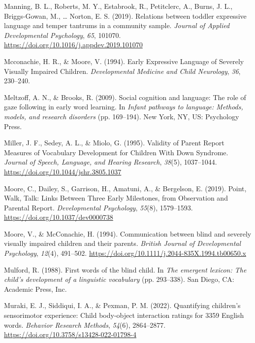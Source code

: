 \documentclass[
  man,floatsintext]{apa6}
\newlength{\cslhangindent}
\newlength{\cslentryspacingunit} %
\newenvironment{CSLReferences}[2] %
 {%
  \setlength{\parindent}{0pt}
  \ifodd #1
  \let\oldpar\par
  \def\par{\hangindent=\cslhangindent\oldpar}
  \fi
  \setlength{\parskip}{#2\cslentryspacingunit}
 }%
 {}
\begin{document}
\begin{CSLReferences}{1}{0}
\leavevmode{}%
Manning, B. L., Roberts, M. Y., Estabrook, R., Petitclerc, A., Burns, J. L., Briggs-Gowan, M., \ldots{} Norton, E. S. (2019). Relations between toddler expressive language and temper tantrums in a community sample. \emph{Journal of Applied Developmental Psychology}, \emph{65}, 101070. \url{https://doi.org/10.1016/j.appdev.2019.101070}

\leavevmode{}%
Mcconachie, H. R., \& Moore, V. (1994). Early {Expressive Language} of {Severely Visually Impaired Children}. \emph{Developmental Medicine and Child Neurology}, \emph{36}, 230--240.

\leavevmode{}%
Meltzoff, A. N., \& Brooks, R. (2009). Social cognition and language: {The} role of gaze following in early word learning. In \emph{Infant pathways to language: {Methods}, models, and research disorders} (pp. 169--194). {New York, NY, US}: {Psychology Press}.

\leavevmode{}%
Miller, J. F., Sedey, A. L., \& Miolo, G. (1995). Validity of {Parent Report Measures} of {Vocabulary Development} for {Children With Down Syndrome}. \emph{Journal of Speech, Language, and Hearing Research}, \emph{38}(5), 1037--1044. \url{https://doi.org/10.1044/jshr.3805.1037}

\leavevmode{}%
Moore, C., Dailey, S., Garrison, H., Amatuni, A., \& Bergelson, E. (2019). Point, {Walk}, {Talk}: {Links Between Three Early Milestones}, from {Observation} and {Parental Report}. \emph{Developmental Psychology}, \emph{55}(8), 1579--1593. \url{https://doi.org/10.1037/dev0000738}

\leavevmode{}%
Moore, V., \& McConachie, H. (1994). Communication between blind and severely visually impaired children and their parents. \emph{British Journal of Developmental Psychology}, \emph{12}(4), 491--502. \url{https://doi.org/10.1111/j.2044-835X.1994.tb00650.x}

\leavevmode{}%
Mulford, R. (1988). First words of the blind child. In \emph{The emergent lexicon: {The} child's development of a linguistic vocabulary} (pp. 293--338). {San Diego, CA}: {Academic Press, Inc.}

\leavevmode{}%
Muraki, E. J., Siddiqui, I. A., \& Pexman, P. M. (2022). Quantifying children's sensorimotor experience: {Child} body-object interaction ratings for 3359 {English} words. \emph{Behavior Research Methods}, \emph{54}(6), 2864--2877. \url{https://doi.org/10.3758/s13428-022-01798-4}


\end{CSLReferences}
\end{document}
